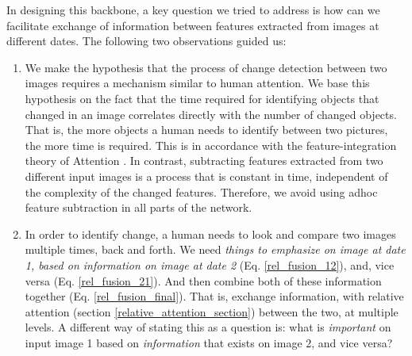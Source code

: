 \documentclass[times, 5p]{elsarticle}
\begin{document}
In designing this backbone, a key question we tried to address is how can we facilitate exchange of information between features extracted from images at different dates.   The following two observations guided us:
\begin{enumerate}
\item  
We make the hypothesis that the process of change detection between two images requires a mechanism similar to human attention. We base this hypothesis on the fact that  the time required for identifying objects that changed in an image correlates directly with the number of changed objects. That is, the more objects a human needs to identify between two pictures, the more time is required. This is in accordance with the feature-integration theory of Attention   \citep{TREISMAN198097}. In contrast, subtracting features extracted from two different input images is a process that is constant in time, independent of the complexity of the changed features. Therefore, we avoid using adhoc feature subtraction in all parts of the network. 
\item  In order to identify change, a human needs to look and compare two images multiple times, back and forth.  We need \emph{things to emphasize on image at date 1, based on information on image at date 2} (Eq. \ref{rel_fusion_12}), and, vice versa (Eq. \ref{rel_fusion_21}). And then combine both of these information together (Eq. \ref{rel_fusion_final}). That is, exchange information, with relative attention (section \ref{relative_attention_section})  between the two, at multiple levels. A different way of stating this as a question is: what is \emph{important} on input image 1 based on \emph{information} that exists on image 2, and vice versa? 
\end{enumerate}
\end{document}
